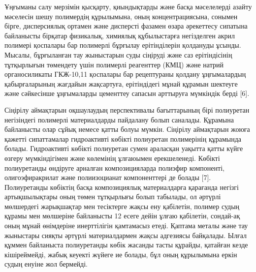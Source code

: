 \begin{multicols}{2}
Ұңғыманы салу мерзімін қысқарту, қиындықтарды және басқа мәселелерді
азайту мәселесін шешу полимердің құрылымына, оның концентрациясына,
сонымен бірге, дисперсиялық ортамен және дисперсті фазамен өзара
әрекеттесу сипатына байланысты бірқатар физикалық, химиялық құбылыстарға
негізделген акрил полимері қоспалары бар полимерлі бұрғылау
ерітінділерін қолдануды ұсынды. Мысалы, бұрғыланған тау жыныстарын суды
сіңіруді және саз ерітіндісінің тұтқырлығын төмендету үшін полимерлі
реагенттер (КМЦ) және натрий органосиликаты ГКЖ-10,11 қоспалары бар
рецептураны қолдану ұңғымалардың қабырғаларының жағдайын жақсартуға,
ерітіндідегі мұнай құрамын шектеуге және сәйкесінше ұңғымаларды
цементтеу сапасын арттыруға мүмкіндік берді {[}6{]}.

Сіңірілу аймақтарын оқшаулаудың перспективалы бағыттарының бірі
полиуретан негізіндегі полимерлі материалдарды пайдалану болып саналады.
Құрамына байланысты олар сұйық немесе қатты болуы мүмкін. Сіңірілу
аймақтарын жоюға қажетті сипаттамалар гидроактивті көбікті полиуретан
полимерінің құрамында болады. Гидроактивті көбікті полиуретан сумен
араласқан уақытта қатты күйге өзгеру мүмкіндігімен және көлемінің
ұлғаюымен ерекшеленеді. Көбікті полиуретанды өндіруге арналған
композицияларда полиэфир компоненті, олигоэфиракрилат және полиизоцианат
компоненттері де болады {[}7{]}. Полиуретанды көбіктің басқа
композициялық материалдарға қарағанда негізгі артықшылықтары оның төмен
тұтқырлығы болып табылады, ол әртүрлі мөлшердегі жарықшақтар мен
тесіктерге жақсы ену қабілетін, полимер судың құрамы мен мөлшеріне
байланысты 12 есеге дейін ұлғаю қабілетін, сондай-ақ оның мұнай
өнімдеріне инерттілігін қамтамасыз етеді. Қаптама металы және тау
жыныстары сияқты әртүрлі материалдармен жақсы адгезиясы байқалады. Ылғал
құммен байланыста полиуретанды көбік жасанды тасты құрайды, қатайған
кезде кішіреймейді, жабық кеуекті жүйеге ие болады, бұл оның құрылымына
еркін судың енуіне жол бермейді.


\end{multicols}
